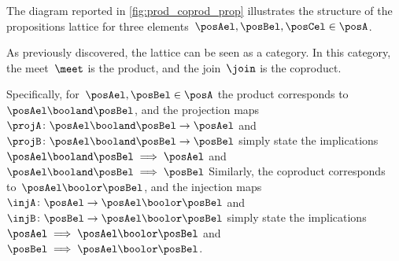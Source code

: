 The diagram reported in \cref{fig:prod_coprod_prop} illustrates the structure of the propositions lattice for three elements~$\posAel,\posBel,\posCel\in \posA$.

As previously discovered, the lattice can be seen as a category.
In this category, the meet~$\meet$ is the product, and the join~$\join$ is the coproduct.

Specifically, for~$\posAel,\posBel\in \posA$ the product corresponds to~$\posAel\booland \posBel$, and the projection maps~$\projA\colon \posAel\booland \posBel\to \posAel$ and~$\projB\colon \posAel\booland \posBel\to \posBel$ simply state the implications~$\posAel \booland \posBel \implies \posAel$ and~$\posAel \booland \posBel \implies \posBel$
Similarly, the coproduct corresponds to~$\posAel\boolor \posBel$, and the injection maps~$\injA\colon \posAel\to \posAel\boolor \posBel$ and~$\injB\colon \posBel\to \posAel\boolor \posBel$ simply state the implications~$\posAel \implies \posAel \boolor \posBel$ and~$\posBel \implies \posAel \boolor \posBel$.